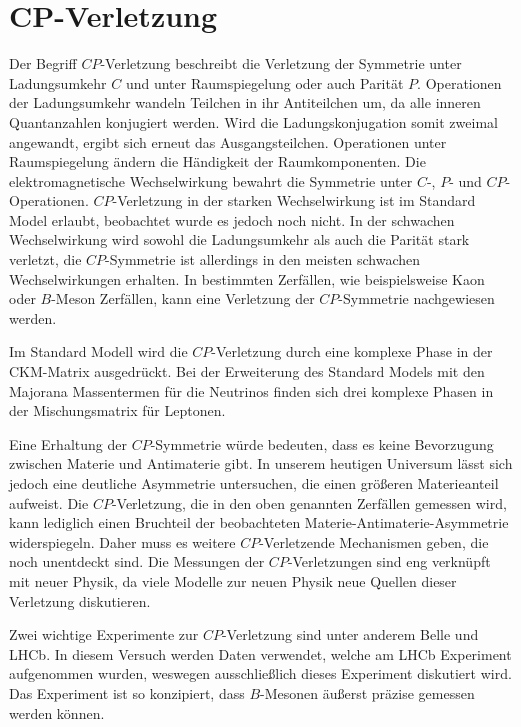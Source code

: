 \section{CP-Verletzung}

Der Begriff $CP$-Verletzung beschreibt die Verletzung der Symmetrie unter Ladungsumkehr $C$ und unter
Raumspiegelung oder auch Parität $P$. Operationen der Ladungsumkehr wandeln Teilchen in ihr
Antiteilchen um, da alle inneren Quantanzahlen konjugiert werden. Wird die Ladungskonjugation somit
zweimal angewandt, ergibt sich erneut das Ausgangsteilchen. Operationen unter Raumspiegelung ändern
die Händigkeit der Raumkomponenten. Die elektromagnetische Wechselwirkung bewahrt
die Symmetrie unter $C$-, $P$- und $CP$-Operationen. $CP$-Verletzung in der starken Wechselwirkung 
ist im Standard Model erlaubt, beobachtet wurde es jedoch noch nicht. In der schwachen Wechselwirkung wird sowohl die
Ladungsumkehr als auch die Parität stark verletzt, die $CP$-Symmetrie ist allerdings in den meisten
schwachen Wechselwirkungen erhalten. In bestimmten Zerfällen, wie beispielsweise Kaon
oder $B$-Meson Zerfällen, kann eine Verletzung der $CP$-Symmetrie nachgewiesen werden.  \par

Im Standard Modell wird die $CP$-Verletzung durch eine komplexe Phase in der CKM-Matrix
ausgedrückt. Bei der Erweiterung des Standard Models mit den Majorana Massentermen für die
Neutrinos finden sich drei komplexe Phasen in der Mischungsmatrix für Leptonen. \par

Eine Erhaltung der $CP$-Symmetrie würde bedeuten, dass es keine Bevorzugung zwischen Materie und
Antimaterie gibt. In unserem heutigen Universum lässt sich jedoch eine deutliche Asymmetrie
untersuchen, die einen größeren Materieanteil aufweist.
Die $CP$-Verletzung, die in den oben genannten Zerfällen gemessen wird, kann lediglich einen Bruchteil der beobachteten Materie-Antimaterie-Asymmetrie widerspiegeln.
Daher muss es weitere $CP$-Verletzende Mechanismen geben, die noch unentdeckt sind. Die
Messungen der $CP$-Verletzungen sind eng verknüpft mit neuer Physik, da viele Modelle zur neuen
Physik neue Quellen dieser Verletzung diskutieren. \par

Zwei wichtige Experimente zur $CP$-Verletzung sind unter anderem Belle und LHCb. In diesem
Versuch werden Daten verwendet, welche am LHCb Experiment aufgenommen wurden, weswegen
ausschließlich dieses Experiment diskutiert wird. Das Experiment ist so konzipiert, dass
$B$-Mesonen äußerst präzise gemessen werden können. \par

